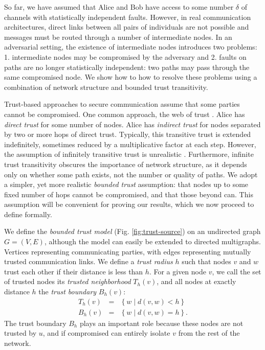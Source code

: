 \documentclass[10pt,letterpaper]{article}
\newcommand{\beq}{\begin{eqnarray}}
\newcommand{\eeq}{\end{eqnarray}}
\begin{document}
So far, we have assumed that Alice and Bob have access to some number
$\delta$ of channels with statistically independent faults.
However, in real communication architectures, direct links between all
pairs of individuals are not possible and messages must be routed through
a number of intermediate nodes.
In an adversarial setting,
the existence of intermediate nodes introduces two problems:
1. intermediate nodes may be compromised by the adversary and
2. faults on paths are no longer statistically independent:
two paths may pass through the same compromised node.
We show how to how to resolve these problems using a combination of network
structure and bounded trust transitivity.

Trust-based approaches to secure communication assume that some parties
cannot be compromised.
One common approach, the web of trust
\cite{zimmermann_official_1995,richters_trust_2011}.
Alice has {\em direct trust} for some number of nodes.
Alice has {\em indirect trust} for nodes separated by two or more hops of
direct trust.
Typically, this transitive trust is extended indefinitely,
sometimes reduced by a multiplicative factor at each step.
However, the assumption of infinitely transitive trust is unrealistic
\cite{christianson_why_1997}.
Furthermore, infinite trust transitivity obscures the importance of network structure,
as it depends only on whether some path exists, not the number or quality of paths.
We adopt a simpler, yet more realistic {\em bounded trust} assumption:
that nodes up to some fixed number of hops cannot be compromised,
and that those beyond can.
This assumption will be convenient for proving our results,
which we now proceed to define formally.

We define the {\em bounded trust model} (Fig. \ref{fig:trust-source}) on
an undirected graph $G = (V,E)$,
although the model can easily be extended to directed multigraphs.
Vertices representing communicating parties,
with edges representing mutually trusted communication links.
We define a {\em trust radius} $h$ such that nodes $v$ and
$w$ trust each other if their distance is less than $h$.
For a given node $v$,
we call the set of trusted nodes its
{\em trusted neighborhood} $T_h(v)$,
and all nodes at exactly distance $h$ the
{\em trust boundary} $B_h(v)$:
\beq
T_h(v) &=& \left\{ w \mid d(v,w) < h \right\} \\
B_h(v) &=& \left\{ w \mid d(v,w) = h \right\}.
\eeq
The trust boundary $B_h$ plays an important role because these nodes are not
trusted by $u$,
and if compromised can entirely isolate $v$ from the rest of the network.
\end{document}
